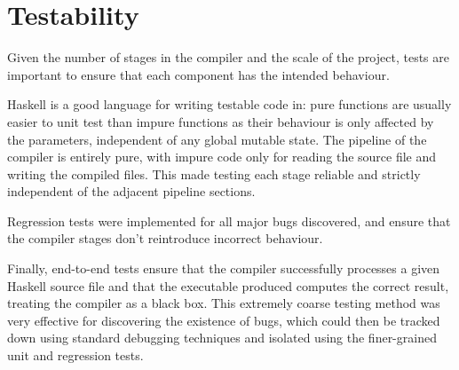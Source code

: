 \documentclass[dissertation.tex]{subfiles}
\begin{document}
\section{Testability}
{

    Given the number of stages in the compiler and the scale of the project, tests are important to ensure that each
    component has the intended behaviour.
    
    Haskell is a good language for writing testable code in: pure functions are usually easier to unit test than impure
    functions as their behaviour is only affected by the parameters, independent of any global mutable state. The
    pipeline of the compiler is entirely pure, with impure code only for reading the source file and writing the
    compiled files. This made testing each stage reliable and strictly independent of the adjacent pipeline sections.

    Regression tests were implemented for all major bugs discovered, and ensure that the compiler stages don't
    reintroduce incorrect behaviour.

    Finally, end-to-end tests ensure that the compiler successfully processes a given Haskell source file and that the
    executable produced computes the correct result, treating the compiler as a black box. This extremely coarse testing
    method was very effective for discovering the existence of bugs, which could then be tracked down using standard
    debugging techniques and isolated using the finer-grained unit and regression tests.


}
\end{document}
